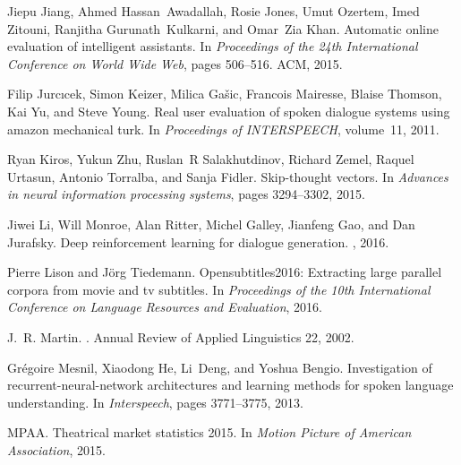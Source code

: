 \documentclass[11pt]{article}
\begin{document}
\begin{thebibliography}{}
Jiepu Jiang, Ahmed Hassan~Awadallah, Rosie Jones, Umut Ozertem, Imed Zitouni,
  Ranjitha Gurunath~Kulkarni, and Omar~Zia Khan.
\newblock Automatic online evaluation of intelligent assistants.
\newblock In {\em Proceedings of the 24th International Conference on World
  Wide Web}, pages 506--516. ACM, 2015.

Filip Jurc{\i}cek, Simon Keizer, Milica Ga{\v{s}}ic, Francois Mairesse, Blaise
  Thomson, Kai Yu, and Steve Young.
\newblock Real user evaluation of spoken dialogue systems using amazon
  mechanical turk.
\newblock In {\em Proceedings of INTERSPEECH}, volume~11, 2011.

Ryan Kiros, Yukun Zhu, Ruslan~R Salakhutdinov, Richard Zemel, Raquel Urtasun,
  Antonio Torralba, and Sanja Fidler.
\newblock Skip-thought vectors.
\newblock In {\em Advances in neural information processing systems}, pages
  3294--3302, 2015.

Jiwei Li, Will Monroe, Alan Ritter, Michel Galley, Jianfeng Gao, and Dan
  Jurafsky.
\newblock Deep reinforcement learning for dialogue generation.
, 2016.

Pierre Lison and J{\"o}rg Tiedemann.
\newblock Opensubtitles2016: Extracting large parallel corpora from movie and
  tv subtitles.
\newblock In {\em Proceedings of the 10th International Conference on Language
  Resources and Evaluation}, 2016.

J.~R. Martin.
.
\newblock Annual Review of Applied Linguistics 22, 2002.

Gr{\'e}goire Mesnil, Xiaodong He, Li~Deng, and Yoshua Bengio.
\newblock Investigation of recurrent-neural-network architectures and learning
  methods for spoken language understanding.
\newblock In {\em Interspeech}, pages 3771--3775, 2013.

MPAA.
\newblock Theatrical market statistics 2015.
\newblock In {\em Motion Picture of American Association}, 2015.


\end{thebibliography}
\end{document}
